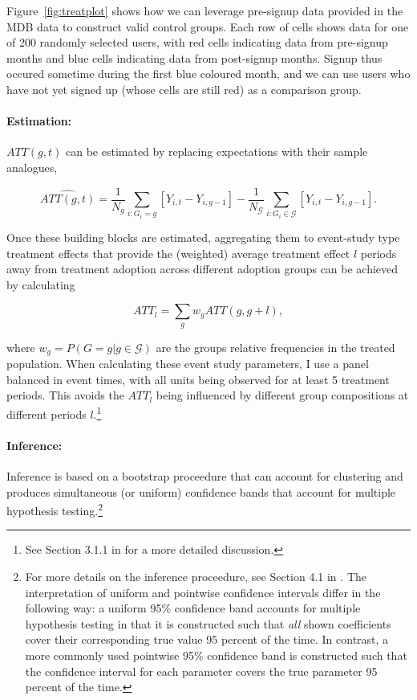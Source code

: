 Figure~\ref{fig:treatplot} shows how we can leverage
pre-signup data provided in the MDB data to construct valid control groups.
Each row of cells shows data for one of 200 randomly selected users, with red
cells indicating data from pre-signup months and blue cells indicating data
from post-signup months. Signup thus occured sometime during the first blue
coloured month, and we can use users who have not yet signed up (whose cells
are still red) as a comparison group.


\paragraph{Estimation:}%
\label{par:estimation_}

$ATT(g,t)$ can be estimated by replacing expectations with their sample
analogues,

\begin{equation}
    \widehat{ATT(g,t)} = \frac{1}{N_g}\sum_{i:G_i=g}[Y_{i,t} - Y_{i, g-1}] -
    \frac{1}{N_\mathcal{G}}\sum_{i:G_i \in \mathcal{G}}[Y_{i,t} - Y_{i, g-1}].
\end{equation}

Once these building blocks are estimated, aggregating them to event-study type treatment effects that provide the (weighted)
average treatment effect $l$ periods away from treatment adoption across
different adoption groups can be achieved by calculating

\begin{equation}
    \label{eq:att_es}
    ATT_l = \sum_g w_gATT(g,g+l),
\end{equation}

\noindent where $w_g = P(G = g | g \in \mathcal{G})$ are the groups relative frequencies in the
treated population. When calculating these event study parameters, I use a
panel balanced in event times, with all units being observed for at least 5
treatment periods. This avoids the $ATT_l$ being influenced by different
group compositions at different periods $l$.\footnote{See Section 3.1.1 in
\citet{callaway2021difference} for a more detailed discussion.}


\paragraph{Inference:}%
\label{par:inference_}

Inference is based on a bootstrap proceedure that can account for clustering
and produces simultaneous (or uniform) confidence bands that account for
multiple hypothesis testing.\footnote{For more details on the inference
    proceedure, see Section 4.1 in \citet{callaway2021difference}. The
    interpretation of uniform and pointwise confidence intervals differ in the
    following way: a uniform 95\% confidence band accounts for multiple
    hypothesis testing in that it is constructed such that \textit{all} shown
    coefficients cover their corresponding true value 95 percent of the time.
    In contrast, a more commonly used pointwise 95\% confidence band is
    constructed such that the confidence interval for each parameter covers the
true parameter 95 percent of the time.} 




